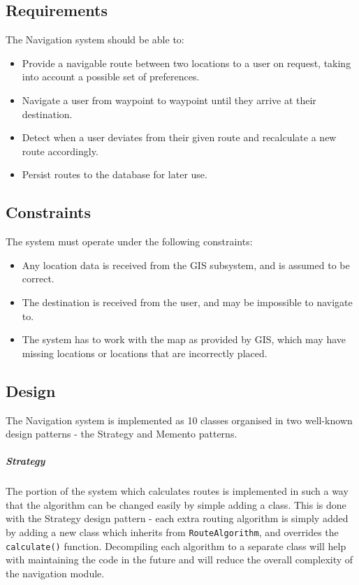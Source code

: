 \documentclass[english]{article}
\begin{document}
       \subsection{Requirements}
            The Navigation system should be able to:
            \begin{itemize}
                \item Provide a navigable route between two locations to a user on request, taking into account a possible set of preferences.
                \item Navigate a user from waypoint to waypoint until they arrive at their destination.
                \item Detect when a user deviates from their given route and recalculate a new route accordingly.
                \item Persist routes to the database for later use.
            \end{itemize}

        \subsection{Constraints}
            The system must operate under the following constraints:
            \begin{itemize}
                \item Any location data is received from the GIS subsystem, and is assumed to be correct.
                \item The destination is received from the user, and may be impossible to navigate to.
                \item The system has to work with the map as provided by GIS, which may have missing locations or locations that are incorrectly placed.
            \end{itemize}

        \subsection{Design}
            The Navigation system is implemented as 10 classes organised in two well-known design patterns - the Strategy and Memento patterns.

            \subparagraph{Strategy}
            The portion of the system which calculates routes is implemented in such a way that the algorithm can be changed easily by simple adding a class. This is done with the Strategy design pattern - each extra routing algorithm is simply added by adding a new class which inherits from \texttt{RouteAlgorithm}, and overrides the \texttt{calculate()} function. Decompiling each algorithm to a separate class will help with maintaining the code in the future and will reduce the overall complexity of the navigation module.
\end{document}
